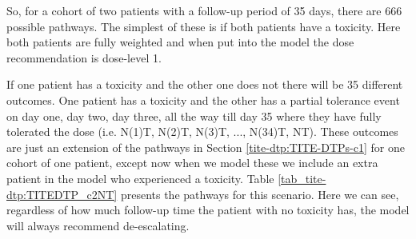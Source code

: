 So, for a cohort of two patients with a follow-up period of 35 days, there are 666 possible pathways. The simplest of these is if both patients have a toxicity. Here both patients are fully weighted and when put into the model the dose recommendation is dose-level 1. 

If one patient has a toxicity and the other one does not there will be 35 different outcomes. One patient has a toxicity and the other has a partial tolerance event on day one, day two, day three, all the way till day 35 where they have fully tolerated the dose (i.e. N(1)T, N(2)T, N(3)T, ..., N(34)T, NT). These outcomes are just an extension of the pathways in Section \ref{tite-dtp:TITE-DTPs-c1} for one cohort of one patient, except now when we model these we include an extra patient in the model who experienced a toxicity. Table \ref{tab_tite-dtp:TITEDTP_c2NT} presents the pathways for this scenario. Here we can see, regardless of how much follow-up time the patient with no toxicity has, the model will always recommend de-escalating. 

